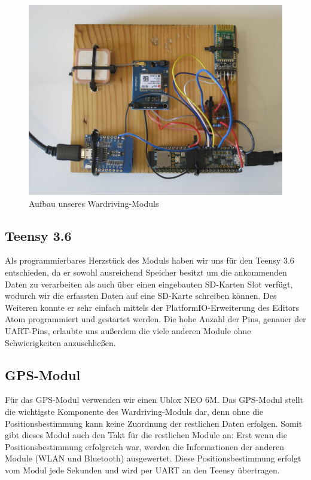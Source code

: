 \documentclass[a4paper,11pt, ngerman]{scrartcl}
\begin{document}
\begin{figure}[H]
	\includegraphics[width=.95\linewidth]{Aufbau.JPG}\caption{Aufbau unseres Wardriving-Moduls}\label{abb:compl}
\end{figure}

\subsection{Teensy 3.6}
Als programmierbares \grqq Herzstück\grqq{} des Moduls haben wir uns für den Teensy 3.6 entschieden, da er sowohl ausreichend Speicher besitzt um die ankommenden Daten zu verarbeiten als auch über einen eingebauten SD-Karten Slot verfügt, wodurch wir die erfassten Daten auf eine SD-Karte schreiben können. Des Weiteren konnte er sehr einfach mittels der \grqq PlatformIO\grqq{}-Erweiterung des Editors \grqq Atom\grqq{} programmiert und gestartet werden. Die hohe Anzahl der Pins, genauer der UART-Pins, erlaubte uns außerdem die viele anderen Module ohne Schwierigkeiten anzuschließen.
\subsection{GPS-Modul}
Für das GPS-Modul verwenden wir einen Ublox NEO 6M.
Das GPS-Modul stellt die wichtigste Komponente des Wardriving-Moduls dar, denn ohne die Positionsbestimmung kann keine Zuordnung der restlichen Daten erfolgen. Somit gibt dieses Modul auch den \grqq Takt\grqq{} für die restlichen Module an: Erst wenn die Positionsbestimmung erfolgreich war, werden die Informationen der anderen Module (WLAN und Bluetooth) ausgewertet. Diese Positionsbestimmung erfolgt vom Modul jede Sekunden und wird per UART an den Teensy übertragen.
\end{document}
